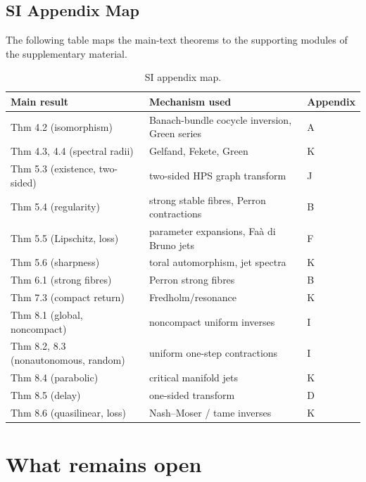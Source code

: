 \documentclass[11pt,a4paper]{article}
\theoremstyle{plain}
\theoremstyle{definition}
\theoremstyle{remark}
\numberwithin{equation}{section}
\numberwithin{figure}{section}
\begin{document}
\subsection*{SI Appendix Map}

The following table maps the main-text theorems to the supporting modules of the supplementary material.

\begin{table}[h]
\centering
\caption{SI appendix map.}
\label{tab:supp-map}
\begin{tabular}{lll}
\textbf{Main result} & \textbf{Mechanism used} & \textbf{Appendix} \\
\hline
Thm 4.2 (isomorphism) & Banach-bundle cocycle inversion, Green series & A \\
Thm 4.3, 4.4 (spectral radii) & Gelfand, Fekete, Green & K \\
Thm 5.3 (existence, two-sided) & two-sided HPS graph transform & J \\
Thm 5.4 (regularity) & strong stable fibres, Perron contractions & B \\
Thm 5.5 (Lipschitz, loss) & parameter expansions, Faà di Bruno jets & F \\
Thm 5.6 (sharpness) & toral automorphism, jet spectra & K \\
Thm 6.1 (strong fibres) & Perron strong fibres & B \\
Thm 7.3 (compact return) & Fredholm/resonance & K \\
Thm 8.1 (global, noncompact) & noncompact uniform inverses & I \\
Thm 8.2, 8.3 (nonautonomous, random) & uniform one-step contractions & I \\
Thm 8.4 (parabolic) & critical manifold jets & K \\
Thm 8.5 (delay) & one-sided transform & D \\
Thm 8.6 (quasilinear, loss) & Nash–Moser / tame inverses & K \\
\end{tabular}
\end{table}


\section{What remains open}
\end{document}
